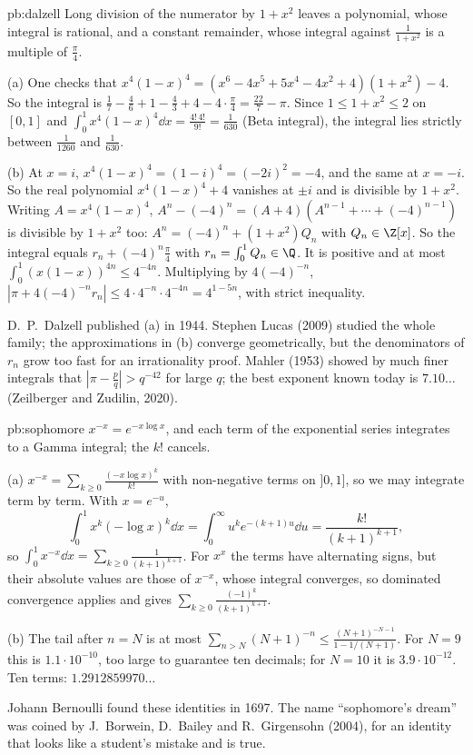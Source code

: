 \begin{solution}{pb:dalzell}
\idea Long division of the numerator by $1+x^2$ leaves a polynomial, whose integral is rational, and a constant remainder, whose
integral against $\frac1{1+x^2}$ is a multiple of $\frac\pi4$.

\writeup (a) One checks that $x^4(1-x)^4=(x^6-4x^5+5x^4-4x^2+4)(1+x^2)-4$. So the integral is
$\frac17-\frac46+1-\frac43+4-4\cdot\frac\pi4=\frac{22}7-\pi$. Since $1\le1+x^2\le2$ on $[0,1]$ and $\int_0^1x^4(1-x)^4\dd x=\frac{4!\,4!}{9!}=\frac1{630}$ (Beta
integral), the integral lies strictly between $\frac1{1260}$ and $\frac1{630}$.

(b) At $x=i$, $x^4(1-x)^4=(1-i)^4=(-2i)^2=-4$, and the same at $x=-i$. So the real polynomial $x^4(1-x)^4+4$ vanishes at $\pm i$ and is
divisible by $1+x^2$. Writing $A=x^4(1-x)^4$, $A^n-(-4)^n=(A+4)(A^{n-1}+\cdots+(-4)^{n-1})$ is divisible by $1+x^2$ too: $A^n=(-4)^n+(1+x^2)Q_n$ with
$Q_n\in\Z[x]$. So the integral equals $r_n+(-4)^n\frac\pi4$ with $r_n=\int_0^1Q_n\in\Q$. It is positive and at most $\int_0^1(x(1-x))^{4n}\le4^{-4n}$.
Multiplying by $4(-4)^{-n}$, $|\pi+4(-4)^{-n}r_n|\le4\cdot4^{-n}\cdot4^{-4n}=4^{1-5n}$, with strict inequality.

\leads D.~P.~Dalzell published (a) in 1944. Stephen Lucas (2009) studied the whole family; the approximations in (b) converge
geometrically, but the denominators of $r_n$ grow too fast for an irrationality proof. Mahler (1953) showed by much finer integrals
that $|\pi-\frac pq|>q^{-42}$ for large $q$; the best exponent known today is $7.10\ldots$ (Zeilberger and Zudilin, 2020).
\end{solution}

\begin{solution}{pb:sophomore}
\idea $x^{-x}=e^{-x\log x}$, and each term of the exponential series integrates to a Gamma integral; the $k!$ cancels.

\writeup (a) $x^{-x}=\sum_{k\ge0}\frac{(-x\log x)^k}{k!}$ with non-negative terms on $]0,1]$, so we may integrate term by term. With $x=e^{-u}$,
\[
\int_0^1x^k(-\log x)^k\dd x=\int_0^\infty u^ke^{-(k+1)u}\dd u=\frac{k!}{(k+1)^{k+1}},
\]
so $\int_0^1x^{-x}\dd x=\sum_{k\ge0}\frac1{(k+1)^{k+1}}$. For $x^x$ the terms have alternating signs, but their absolute values are those of $x^{-x}$,
whose integral converges, so dominated convergence applies and gives $\sum_{k\ge0}\frac{(-1)^k}{(k+1)^{k+1}}$.

(b) The tail after $n=N$ is at most $\sum_{n>N}(N+1)^{-n}\le\frac{(N+1)^{-N-1}}{1-1/(N+1)}$. For $N=9$ this is $1.1\cdot10^{-10}$, too large to guarantee ten
decimals; for $N=10$ it is $3.9\cdot10^{-12}$. Ten terms: $1.2912859970\ldots$

\leads Johann Bernoulli found these identities in 1697. The name ``sophomore's dream'' was coined by J.~Borwein, D.~Bailey and
R.~Girgensohn (2004), for an identity that looks like a student's mistake and is true.
\end{solution}

